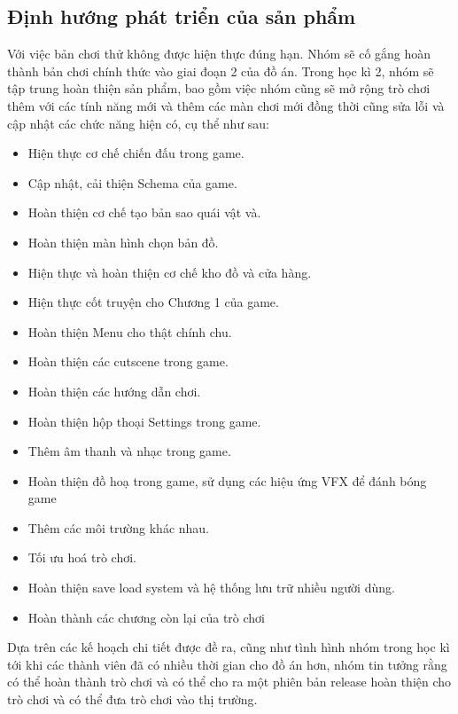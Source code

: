 \subsection{Định hướng phát triển của sản phẩm}
\hspace*{0.5cm} Với việc bản chơi thử không được hiện thực đúng hạn. Nhóm sẽ cố gắng hoàn thành bản chơi chính thức vào giai đoạn 2 của đồ án. Trong học kì 2, nhóm sẽ tập trung hoàn thiện sản phẩm, bao gồm việc nhóm cũng sẽ mở rộng trò chơi thêm với các tính năng mới và thêm các màn chơi mới đồng thời cũng sửa lỗi và cập nhật các chức năng hiện có, cụ thể như sau:
\begin{itemize}
	\item Hiện thực cơ chế chiến đấu trong game.
	\item Cập nhật, cải thiện Schema của game.
	\item Hoàn thiện cơ chế tạo bản sao quái vật và.
	\item Hoàn thiện màn hình chọn bản đồ.
	\item Hiện thực và hoàn thiện cơ chế kho đồ và cửa hàng.
	\item Hiện thực cốt truyện cho Chương 1 của game.
	\item Hoàn thiện Menu cho thật chính chu.
	\item Hoàn thiện các cutscene trong game.
	\item Hoàn thiện các hướng dẫn chơi.
	\item Hoàn thiện hộp thoại Settings trong game.
	\item Thêm âm thanh và nhạc trong game.
	\item Hoàn thiện đồ hoạ trong game, sử dụng các hiệu ứng VFX để đánh bóng game
	\item Thêm các môi trường khác nhau.
	\item Tối ưu hoá trò chơi.
	\item Hoàn thiện save load system và hệ thống lưu trữ nhiều người dùng.
	\item Hoàn thành các chương còn lại của trò chơi
\end{itemize}
\hspace*{0.5cm} Dựa trên các kế hoạch chi tiết được đề ra, cũng như tình hình nhóm trong học kì tới khi các thành viên đã có nhiều thời gian cho đồ án hơn, nhóm tin tưởng rằng có thể hoàn thành trò chơi và có thể cho ra một phiên bản release hoàn thiện cho trò chơi và có thể đưa trò chơi vào thị trường.
